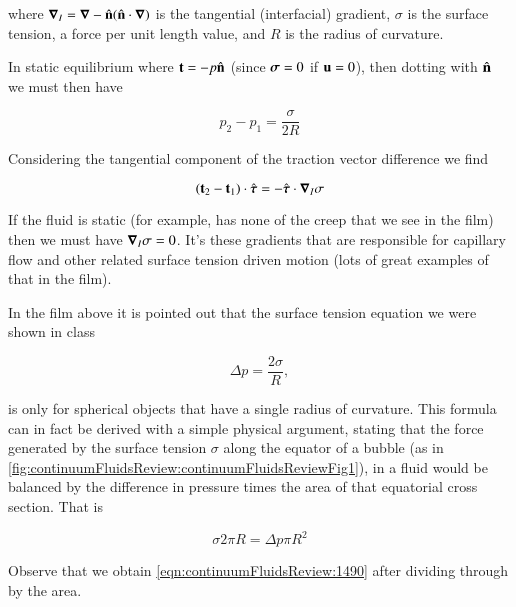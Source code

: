 where $\boldsymbol{\nabla}_I = \boldsymbol{\nabla} - \hat{\mathbf{n}} (\hat{\mathbf{n}} \cdot \boldsymbol{\nabla})$ is the tangential (interfacial) gradient, $\sigma$ is the surface tension, a force per unit length value, and $R$ is the radius of curvature.

In static equilibrium where $\mathbf{t} = -p \hat{\mathbf{n}}$ (since $\boldsymbol{\sigma} = 0$ if $\mathbf{u} = 0$), then dotting with $\hat{\mathbf{n}}$ we must then have

\begin{equation}\label{eqn:continuumFluidsReview:2110}
p_2 - p_1 = \frac{\sigma}{2 R} 
\end{equation}


Considering the tangential component of the traction vector difference we find

\begin{equation}\label{eqn:continuumFluidsReview:2130}
(\mathbf{t}_2 - \mathbf{t}_1) \cdot \hat{\boldsymbol{\tau}} = - \hat{\boldsymbol{\tau}} \cdot \boldsymbol{\nabla}_I \sigma
\end{equation}

If the fluid is static (for example, has none of the creep that we see in the film) then we must have $\boldsymbol{\nabla}_I \sigma = 0$.  It's these gradients that are responsible for capillary flow and other related surface tension driven motion (lots of great examples of that in the film).


In the film above it is pointed out that the surface tension equation we were shown in class

\begin{equation}\label{eqn:continuumFluidsReview:1490}
\Delta p = \frac{2 \sigma}{R},
\end{equation}

is only for spherical objects that have a single radius of curvature.  This formula can in fact be derived with a simple physical argument, stating that the force generated by the surface tension $\sigma$ along the equator of a bubble (as in \ref{fig:continuumFluidsReview:continuumFluidsReviewFig1}), in a fluid would be balanced by the difference in pressure times the area of that equatorial cross section.  That is


\begin{equation}\label{eqn:continuumFluidsReview:1510}
\sigma 2 \pi R = \Delta p \pi R^2
\end{equation}

Observe that we obtain \ref{eqn:continuumFluidsReview:1490} after dividing through by the area.

